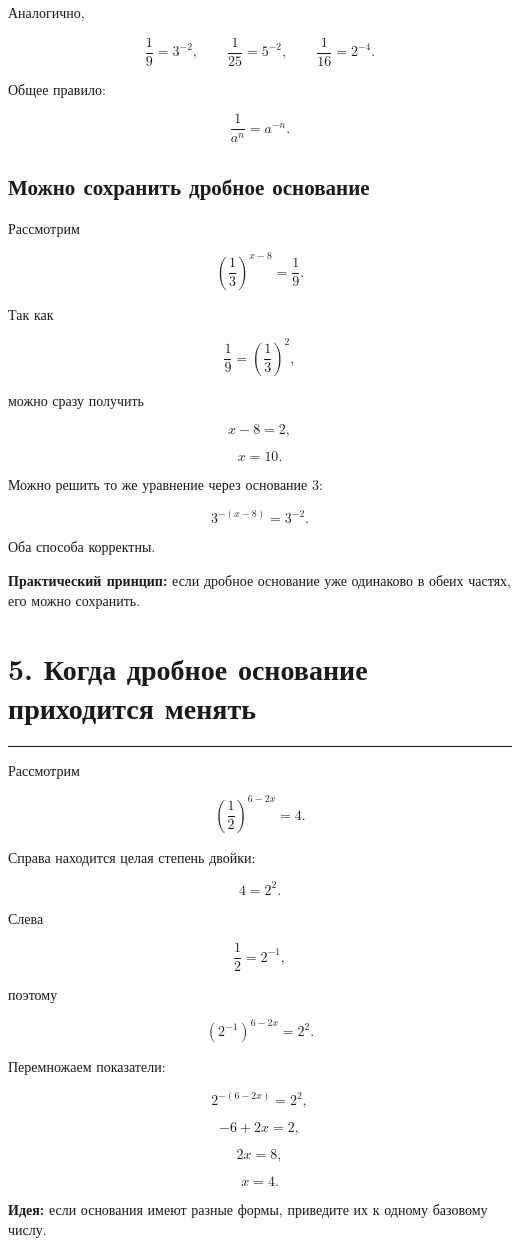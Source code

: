 \documentclass[a4paper,12pt]{article}
\newcommand{\sectionline}{\par\vspace{0.15em}\noindent\textcolor{accent}{\rule{\linewidth}{0.7pt}}\par\vspace{0.2em}}
\newcommand{\key}[1]{\textcolor{darkaccent}{\textbf{#1}}}
\begin{document}
Аналогично,

\[
\frac19=3^{-2},
\qquad
\frac1{25}=5^{-2},
\qquad
\frac1{16}=2^{-4}.
\]

Общее правило:

\[
\frac1{a^n}=a^{-n}.
\]

\subsection*{Можно сохранить дробное основание}

Рассмотрим

\[
\left(\frac13\right)^{x-8}=\frac19.
\]

Так как

\[
\frac19=\left(\frac13\right)^2,
\]

можно сразу получить

\[
x-8=2,
\]

\[
\boxed{x=10}.
\]

Можно решить то же уравнение через основание \(3\):

\[
3^{-(x-8)}=3^{-2}.
\]

Оба способа корректны.

\key{Практический принцип:}
если дробное основание уже одинаково в обеих частях, его можно сохранить.


\section*{5. Когда дробное основание приходится менять}
\sectionline

Рассмотрим

\[
\left(\frac12\right)^{6-2x}=4.
\]

Справа находится целая степень двойки:

\[
4=2^2.
\]

Слева

\[
\frac12=2^{-1},
\]

поэтому

\[
\left(2^{-1}\right)^{6-2x}=2^2.
\]

Перемножаем показатели:

\[
2^{-(6-2x)}=2^2,
\]

\[
-6+2x=2,
\]

\[
2x=8,
\]

\[
\boxed{x=4}.
\]

\key{Идея:}
если основания имеют разные формы, приведите их к одному базовому числу.
\end{document}

